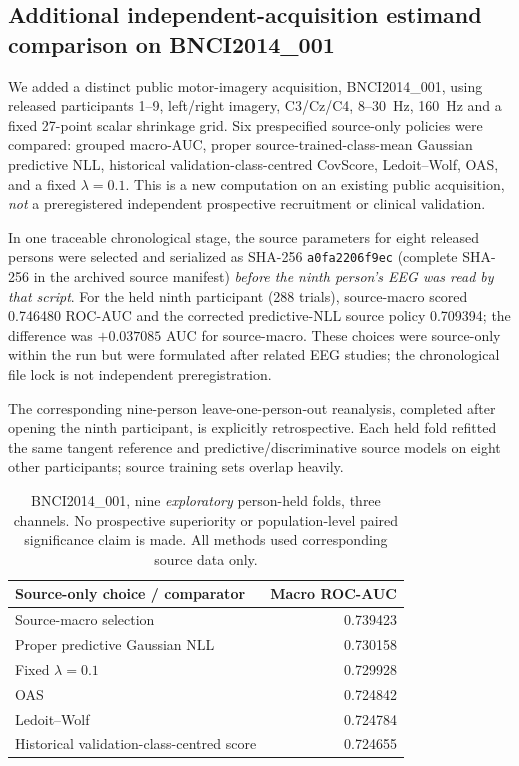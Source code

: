 \subsection{Additional independent-acquisition estimand comparison on BNCI2014\_001}
\label{sec:p1-bnci001-external-estimand}
We added a distinct public motor-imagery acquisition,
BNCI2014\_001, using released participants 1--9,
left/right imagery, C3/Cz/C4, 8--30~Hz, 160~Hz and
a fixed 27-point scalar shrinkage grid.
Six prespecified source-only policies were compared:
grouped macro-AUC, proper source-trained-class-mean
Gaussian predictive NLL, historical validation-class-centred
CovScore, Ledoit--Wolf, OAS, and a fixed $\lambda=0.1$.
This is a new computation on an existing public
acquisition, \emph{not} a preregistered independent
prospective recruitment or clinical validation.

In one traceable chronological stage, the source
parameters for eight released persons were selected
and serialized as SHA-256
\texttt{a0fa2206f9ec} (complete SHA-256 in the archived source manifest)
\emph{before the ninth person's EEG was read by that script}.
For the held ninth participant (288 trials), source-macro
scored 0.746480 ROC-AUC and the corrected predictive-NLL
source policy 0.709394; the difference was
$+0.037085$ AUC for source-macro. These choices
were source-only within the run but were formulated
after related EEG studies; the chronological file lock
is not independent preregistration.

The corresponding nine-person leave-one-person-out
reanalysis, completed after opening the ninth participant,
is explicitly retrospective. Each held fold refitted
the same tangent reference and predictive/discriminative
source models on eight other participants; source
training sets overlap heavily.
\begin{table}[tb]
\centering\small
\caption{BNCI2014\_001, nine \emph{exploratory} person-held
folds, three channels. No prospective superiority or
population-level paired significance claim is made.
All methods used corresponding source data only.}
\label{tab:p1-bnci001-new}
\begin{tabular}{lr}
\toprule
Source-only choice / comparator & Macro ROC-AUC\\
\midrule
Source-macro selection & 0.739423\\
Proper predictive Gaussian NLL & 0.730158\\
Fixed $\lambda=0.1$ & 0.729928\\
OAS & 0.724842\\
Ledoit--Wolf & 0.724784\\
Historical validation-class-centred score & 0.724655\\
\bottomrule
\end{tabular}
\end{table}

